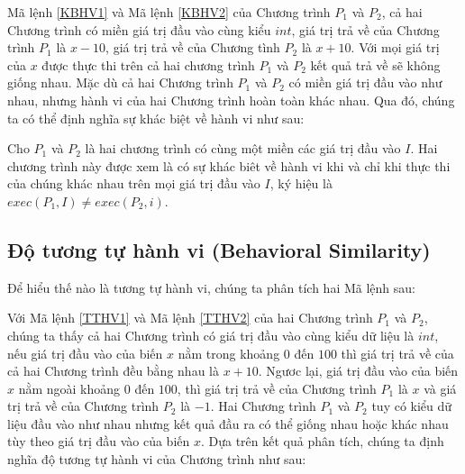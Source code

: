 Mã lệnh \ref{KBHV1} và Mã lệnh \ref{KBHV2}  của Chương trình $P_{1}$ và $P_{2}$, cả hai Chương trình có miền giá trị đầu vào cùng kiểu $int$, giá trị trả về của Chương trình $P_{1}$ là $x - 10$, giá trị trả về của Chương tình $P_{2}$ là $x + 10$. Với mọi giá trị của $x$ được thực thi trên cả hai chương trình $P_{1}$ và $P_{2}$ kết quả trả về sẽ không giống nhau. Mặc dù cả hai Chương trình $P_{1}$ và $P_{2}$ có miền giá trị đầu vào như nhau, nhưng hành vi của hai Chương trình hoàn toàn khác nhau. Qua đó, chúng ta có thể định nghĩa sự khác biệt về hành vi như sau:

\begin{definition}
Cho $P_{1}$ và $P_{2}$ là hai chương trình có cùng một miền các giá trị đầu vào $I$. Hai chương trình này được xem là có sự khác biêt về hành vi khi và chỉ khi thực thi của chúng khác nhau trên mọi giá trị đầu vào $I$, ký hiệu là $exec(P_{1}, I) \neq exec(P_{2}, i)$.
\end{definition}

\subsection{Độ tương tự hành vi (Behavioral Similarity)}
Để hiểu thế nào là tương tự hành vi, chúng ta phân tích hai Mã lệnh sau:

\begin{minipage}[t]{0.45\linewidth}
	
\end{minipage}%
\hfill\vrule\hfill
\begin{minipage}[t]{0.45\linewidth}
	
\end{minipage}%

Với Mã lệnh \ref{TTHV1} và Mã lệnh \ref{TTHV2} của hai Chương trình $P_{1}$ và $P_{2}$, chúng ta thấy cả hai Chương trình có giá trị đầu vào cùng kiểu dữ liệu là $int$, nếu giá trị đầu vào của biến $x$ nằm trong khoảng $0$ đến $100$ thì giá trị trả về của cả hai Chương trình đều bằng nhau là $x+10$. Ngươc lại, giá trị đầu vào của biến $x$ nằm ngoài khoảng $0$ đến $100$, thì giá trị trả về của Chương trình $P_{1}$ là $x$ và giá trị trả về của Chương trình $P_{2}$ là $-1$. Hai Chương trình $P_{1}$ và $P_{2}$ tuy có kiểu dữ liệu đầu vào như nhau nhưng kết quả đầu ra có thể giống nhau hoặc khác nhau tùy theo giá trị đầu vào của biến $x$. Dựa trên kết quả phân tích, chúng ta định nghĩa độ tương tự hành vi của Chương trình như sau:

